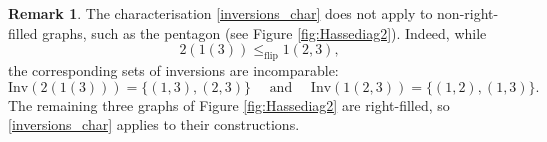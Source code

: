 \documentclass{article}
\theoremstyle{plain}
\theoremstyle{definition}
\newtheorem{remark}[thm]{Remark}
\newcommand{\Inv}{{\mathrm{Inv}}}
\begin{document}
\begin{remark}
The characterisation \eqref{inversions_char} does not apply to non-right-filled graphs, such as the pentagon  (see Figure \ref{fig:Hassediag2}).
 Indeed, while $$2(1(3))\leq_{\operatorname{flip}} 1(2,3),$$ the corresponding sets of inversions are incomparable: $$\Inv(2(1(3)))=\{(1,3),(2,3)\} \quad \mbox{ and } \quad \Inv(1(2,3))=\{(1,2),(1,3)\}.$$ The remaining three graphs of Figure \ref{fig:Hassediag2} are right-filled, so \eqref{inversions_char} applies to their constructions. 
\end{remark}
\end{document}
